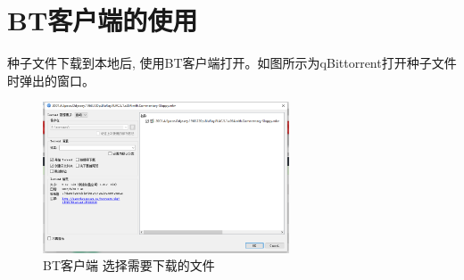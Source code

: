 \section{BT客户端的使用}

种子文件下载到本地后, 使用BT客户端打开。如图所示为qBittorrent打开种子文件时弹出的窗口。

\begin{figure}[h]
    \centering
    \includegraphics[width=0.65\textwidth]{support-files/5.4-bt-client-1.png}
    \caption{BT客户端 选择需要下载的文件}
    \label{fig:btclient1}
\end{figure}

